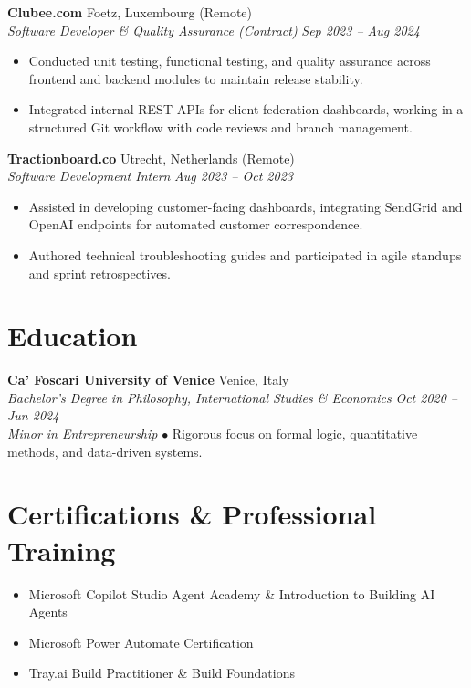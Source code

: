 \documentclass[10pt,a4paper]{article}
\begin{document}
\vspace{4pt}
\textbf{Clubee.com} \hfill Foetz, Luxembourg (Remote) \\
\textit{Software Developer \& Quality Assurance (Contract)} \hfill \textit{Sep 2023 -- Aug 2024}
\begin{itemize}
    \item Conducted unit testing, functional testing, and quality assurance across frontend and backend modules to maintain release stability.
    \item Integrated internal REST APIs for client federation dashboards, working in a structured Git workflow with code reviews and branch management.
\end{itemize}

\vspace{4pt}
\textbf{Tractionboard.co} \hfill Utrecht, Netherlands (Remote) \\
\textit{Software Development Intern} \hfill \textit{Aug 2023 -- Oct 2023}
\begin{itemize}
    \item Assisted in developing customer-facing dashboards, integrating SendGrid and OpenAI endpoints for automated customer correspondence.
    \item Authored technical troubleshooting guides and participated in agile standups and sprint retrospectives.
\end{itemize}

\section*{Education}
\small
\textbf{Ca' Foscari University of Venice} \hfill Venice, Italy \\
\textit{Bachelor's Degree in Philosophy, International Studies \& Economics} \hfill \textit{Oct 2020 -- Jun 2024} \\
\textit{Minor in Entrepreneurship} \enspace $\bullet$ \enspace Rigorous focus on formal logic, quantitative methods, and data-driven systems.

\section*{Certifications \& Professional Training}
\small
\begin{itemize}
    \item Microsoft Copilot Studio Agent Academy \& Introduction to Building AI Agents
    \item Microsoft Power Automate Certification
    \item Tray.ai Build Practitioner \& Build Foundations
\end{itemize}
\end{document}
